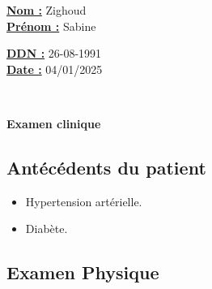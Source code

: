 \documentclass[12pt,a4paper]{article}%
\begin{document}
%
\normalsize%
\begin{minipage}{0.5\linewidth}%
\textbf{\underline{Nom :}} \hspace{1cm} Zighoud%
\\%
\textbf{\underline{Prénom :}} \hspace{1cm} Sabine%
\\%
\end{minipage}%
\begin{minipage}{0.5\linewidth}%
\textbf{\underline{DDN :}} \hspace{1cm} 26-08-1991%
\\%
\textbf{\underline{Date :}} \hspace{1cm} 04/01/2025%
\\%
\end{minipage}%
\hspace{\textwidth}%
\\%
\begin{center}%

        \begin{tcolorbox}[
            colframe=main_title_border_color,        %
            colback=main_title_background_color,        %
            coltitle=main_title_border_color,       %
            arc=8pt,              %
            boxrule=0.5mm,          %
            auto outer arc,       %
            width=\linewidth,     %
            halign=center         %
        ]
        \LARGE{\textbf{Examen clinique}}
        \end{tcolorbox}
\end{center}%
%
\vspace*{\baselineskip}%
\subsection*{Antécédents du patient}%
\label{subsec:Antcdentsdupatient}%

%
\begin{itemize}%
\setlength{\itemsep}{0pt}%
\item%
Hypertension artérielle.%
\item%
Diabète.%
\end{itemize}%
\subsection*{Examen Physique}%
\label{subsec:ExamenPhysique}%
\end{document}
